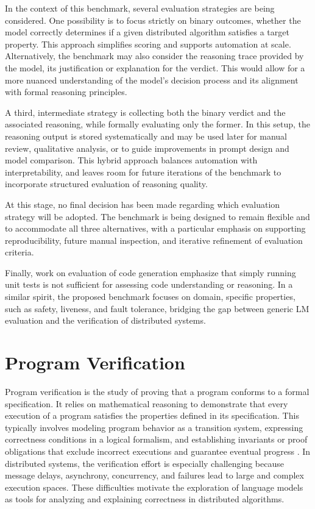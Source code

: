 In the context of this benchmark, several evaluation strategies are being considered. One possibility is to focus strictly on binary outcomes, whether the model correctly determines if a given distributed algorithm satisfies a target property. This approach simplifies scoring and supports automation at scale. Alternatively, the benchmark may also consider the reasoning trace provided by the model, its justification or explanation for the verdict. This would allow for a more nuanced understanding of the model’s decision process and its alignment with formal reasoning principles.

A third, intermediate strategy is collecting both the binary verdict and the associated reasoning, while formally evaluating only the former. In this setup, the reasoning output is stored systematically and may be used later for manual review, qualitative analysis, or to guide improvements in prompt design and model comparison. This hybrid approach balances automation with interpretability, and leaves room for future iterations of the benchmark to incorporate structured evaluation of reasoning quality.

At this stage, no final decision has been made regarding which evaluation strategy will be adopted. The benchmark is being designed to remain flexible and to accommodate all three alternatives, with a particular emphasis on supporting reproducibility, future manual inspection, and iterative refinement of evaluation criteria.

Finally, work on evaluation of code generation\cite{ghosh2023benchmarks} emphasize that simply running unit tests is not sufficient for assessing code understanding or reasoning. 
In a similar spirit, the proposed benchmark focuses on domain, specific properties, such as safety, liveness, and fault tolerance, bridging the gap between generic LM evaluation and the verification of distributed systems.

\section{Program Verification}

Program verification is the study of proving that a program conforms to a formal specification. It relies on mathematical reasoning to demonstrate that every execution of a program satisfies the properties defined in its specification. This typically involves modeling program behavior as a transition system, expressing correctness conditions in a logical formalism, and establishing invariants or proof obligations that exclude incorrect executions and guarantee eventual progress \cite{dijkstra1972veryidea, apt1981foundations}. In distributed systems, the verification effort is especially challenging because message delays, asynchrony, concurrency, and failures lead to large and complex execution spaces. These difficulties motivate the exploration of language models as tools for analyzing and explaining correctness in distributed algorithms.

